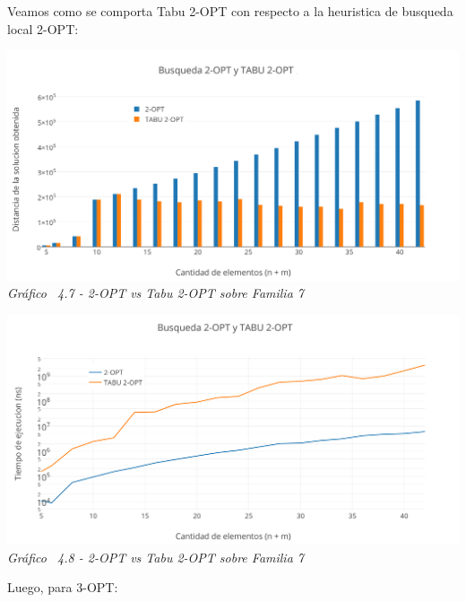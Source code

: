 Veamos como se comporta Tabu 2-OPT con respecto a la heuristica de busqueda local 2-OPT:

\vspace*{0.3cm} \vspace*{0.3cm}
  \begin{center}
 \includegraphics[scale=0.5]{./EJ4/comparativoanillos2opt.png}\\
 {            \textit{Gráfico \ 4.7 - 2-OPT vs Tabu 2-OPT sobre Familia 7}}
  \end{center}
  \vspace*{0.3cm}

\vspace*{0.3cm} \vspace*{0.3cm}
  \begin{center}
 \includegraphics[scale=0.5]{./EJ4/medicionanillos2opt.png}\\
 {            \textit{Gráfico \ 4.8 - 2-OPT vs Tabu 2-OPT sobre Familia 7}}
  \end{center}
  \vspace*{0.3cm}

Luego, para 3-OPT:

